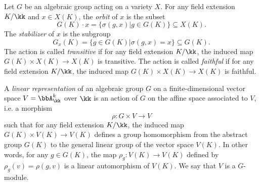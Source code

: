     \begin{definition}\label{def:basic_concepts_in_group_action}
        Let \(G\) be an algebraic group acting on a variety \(X\).
        For any field extension \(K/\kk\) and \(x \in X(K)\), the \emph{orbit} of \(x\) is the subset
        \[
            G(K) \cdot x = \{\sigma(g,x) | g \in G(K)\} \subseteq X(K).
        \]
        The \emph{stabilizer} of \(x\) is the subgroup
        \[
            G_x(K) = \{g \in G(K) | \sigma(g,x) = x\} \subseteq G(K).
        \]
        The action is called \emph{transitive} if for any field extension \(K/\kk\), the induced map \(G(K) \times X(K) \to X(K)\) is transitive.
        The action is called \emph{faithful} if for any field extension \(K/\kk\), the induced map \(G(K) \times X(K) \to X(K)\) is faithful.
    \end{definition}

    \begin{example}\label{eg:linear_representation}
        A \emph{linear representation} of an algebraic group \(G\) on a finite-dimensional vector space \(V = \bbA_\kk^k\) over \(\kk\) is an action of \(G\) on the affine space associated to \(V\), i.e. a morphism
        \[
            \rho: G \times V \to V
        \]
        such that for any field extension \(K/\kk\), the induced map \(G(K) \times V(K) \to V(K)\) defines a group homomorphism from the abstract group \(G(K)\) to the general linear group of the vector space \(V(K)\).
        In other words, for any \(g \in G(K)\), the map \(\rho_g: V(K) \to V(K)\) defined by \(\rho_g(v) = \rho(g,v)\) is a linear automorphism of \(V(K)\).
        We say that \(V\) is a \(G\)-module.
    \end{example}

